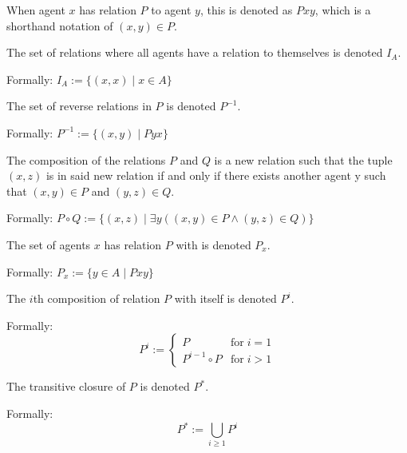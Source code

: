 \begin{definition}
    
\begin{subdefinition}
    When agent \(x\) has relation \(P\) to agent \(y\), this is denoted as \(Pxy\), which is a shorthand notation of \( (x,y) \in P \).
    \label{def:rel-bin}
\end{subdefinition}

\begin{subdefinition}
    The set of relations where all agents have a relation to themselves is denoted \(I_A\).
    
    Formally: \(I_A := \{(x,x) \mid x \in A\}\)
    \label{def:rel-id}
\end{subdefinition}

\begin{subdefinition}
    The set of reverse relations in \(P\) is denoted \(P^{-1}\).

    Formally: \(P^{-1} := \{(x,y) \mid Pyx\}\)
    \label{def:rel-conv}
\end{subdefinition}

\begin{subdefinition}
    The composition of the relations \(P\) and \(Q\) is a new relation such that the tuple \((x,z)\) is in said new relation if and only if there exists another agent y such that \((x,y) \in P\) and \((y,z) \in Q\).

    Formally: \(P \circ Q := \{(x,z) \mid \exists y ((x, y) \in P \land (y, z) \in Q) \}\)
    \label{def:rel-comp}
\end{subdefinition}

\begin{subdefinition}
    The set of agents \(x\) has relation \(P\) with is denoted \(P_x\).

    Formally: \(P_x := \{ y \in A \mid Pxy \}\)
    \label{def:rel-acq} %
\end{subdefinition}

\begin{subdefinition}
    The \(i\)th composition of relation \(P\) with itself is denoted \(P^i\).

    Formally: 
    \[
        P^i := 
        \begin{cases}
            P               & \text{for} \; i = 1\\
            P^{i-1} \circ P & \text{for} \; i > 1
        \end{cases}
    \]
    \label{def:rel-icomp}
\end{subdefinition}

\begin{subdefinition}
    The transitive closure of \(P\) is denoted \(P^*\).

    Formally:
    \[
        P^* := \bigcup_{i \geq 1} P^i
    \]
    \label{def:rel-star} %
\end{subdefinition}
\end{definition}

